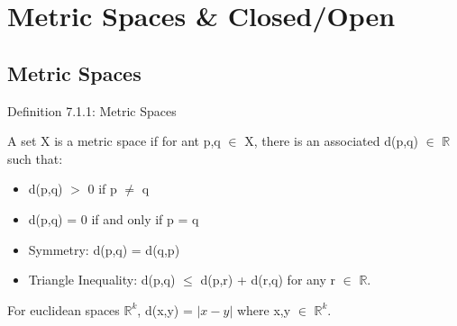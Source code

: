 \newpage

\section[Day 7: Metric Spaces and Closed/Open]{ Metric Spaces \& Closed/Open }

\subsection{ Metric Spaces }

{ \color{blue} Definition 7.1.1: Metric Spaces } 

	\begin{adjustbox}{minipage=14cm, right, vspace=0.1cm 0cm}
		A set X is a metric space if for ant p,q $\in$ X, there is an associated d(p,q) $\in$
		$\mathbb{R}$ such that:

		\begin{itemize}[leftmargin=1cm, itemsep=0.1cm]
			\item d(p,q) $>$ 0 \qquad \qquad if p $\neq$ q
			
			\item d(p,q) = 0 if and only if p = q
			
			\item {\color{lblue} Symmetry}:
				d(p,q) = d(q,p)
			
			\item {\color{lblue} Triangle Inequality}:
				d(p,q) $\leq$ d(p,r) + d(r,q) \qquad \qquad for any r $\in$ $\mathbb{R}$.
		\end{itemize}

		For euclidean spaces $\mathbb{R}^k$, d(x,y) = $| x - y |$ where x,y $\in$ $\mathbb{R}^k$. \\
	\end{adjustbox}

